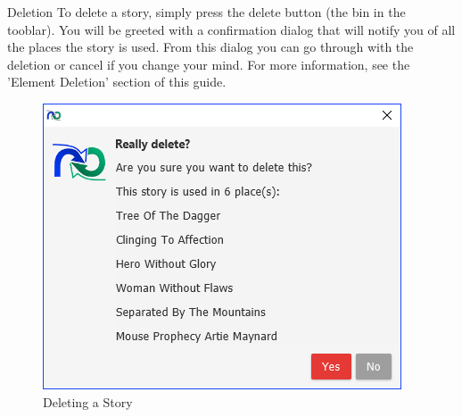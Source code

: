 Deletion\newline
To delete a story, simply press the delete button (the bin in the tooblar). You will be greeted with a confirmation dialog that will notify you of all the places the story is used. From this dialog you can go through with the deletion or cancel if you change your mind. For more information, see the 'Element Deletion' section of this guide.

\begin{figure}[H]
\centering
\includegraphics[width=\textwidth]{images/screenshots/stories5.PNG}
\caption{Deleting a Story}
\label{fig:new_project}
\end{figure}
